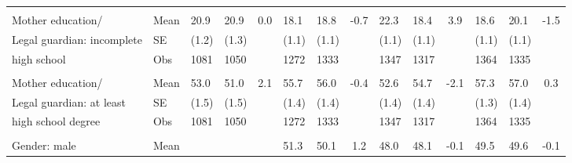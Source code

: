 \documentclass[
	article,			%
	12pt,				%
	oneside,			%
	a4paper,			%
	]{article}
\begin{document}
\begin{table}[h!]
\begin{tabular}{lp{2.335em}p{1.665em}p{1.665em}cp{1.665em}p{1.665em}cp{1.665em}p{1.665em}cp{1.665em}p{1.665em}c}
           &            &            &            &            &            &            &            &            &            &            &            &            &            \\

Mother education/ &       Mean &       20.9 &       20.9 &        0.0 &       18.1 &       18.8 &       -0.7 &       22.3 &       18.4 &      3.9 &       18.6 &       20.1 &       -1.5 \\

Legal guardian: incomplete  &         SE &      (1.2) &      (1.3) &            &      (1.1) &      (1.1) &            &      (1.1) &      (1.1) &            &      (1.1) &      (1.1) &            \\

high school &        Obs &       1081 &       1050 &            &       1272 &       1333 &            &       1347 &       1317 &            &       1364 &       1335 &            \\

           &            &            &            &            &            &            &            &            &            &            &            &            &            \\

Mother education/ &       Mean &       53.0 &       51.0 &        2.1 &       55.7 &       56.0 &       -0.4 &       52.6 &       54.7 &       -2.1 &       57.3 &       57.0 &        0.3 \\

Legal guardian:  at least  &         SE &      (1.5) &      (1.5) &            &      (1.4) &      (1.4) &            &      (1.4) &      (1.4) &            &      (1.3) &      (1.4) &            \\

high school degree &        Obs &       1081 &       1050 &            &       1272 &       1333 &            &       1347 &       1317 &            &       1364 &       1335 &            \\

           &            &            &            &            &            &            &            &            &            &            &            &            &            \\

Gender: male &       Mean &            &            &            &       51.3 &       50.1 &        1.2 &       48.0 &       48.1 &       -0.1 &       49.5 &       49.6 &       -0.1 \\


\end{tabular}
\end{table}
\end{document}
